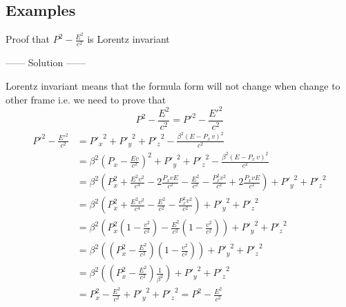 \subsection{Examples}
\begin{example}
Proof that $P^2 - \frac{E^2}{c^2}$ is Lorentz invariant
\begin{center}
    ------ \textcolor{Solution}{Solution} ------
\end{center}
Lorentz invariant means that the formula form will not change when change to other frame i.e. we need to prove that 
\[
    P^2 - \frac{E^2}{c^2} = {P'}^2 - \frac{{E'}^2}{c^2}
\]
\begin{align*}
    {P'}^2 - \frac{{E'}^2}{c^2} &={P'_x}^2 + {P'_y}^2 + {P'_z}^2 - \frac{\beta^2{\left(E - P_x\, v\right)}^2}{c^2}\\
                                &=\beta^2{\left(P_x - \frac{Ev}{c^2}\right)}^2 + {P'_y}^2 + {P'_z}^2 - \frac{\beta^2{\left(E - P_x\, v\right)}^2}{c^2}\\
                                &=\beta^2\left(P_x^2 + \frac{E^2v^2}{c^4} - 2\frac{P_x v E }{c^2} - \frac{E^2}{c^2} - \frac{P_x^2 v^2}{c^2} + 2\frac{P_x v E}{c^2}\right) + {P'_y}^2 + {P'_z}^2\\
                                &=\beta^2\left(P_x^2 + \frac{E^2v^2}{c^4} - \frac{E^2}{c^2} - \frac{P_x^2 v^2}{c^2}\right) + {P'_y}^2 + {P'_z}^2\\
                                &=\beta^2\left(P_x^2\left(1 - \frac{v^2}{c^2}\right)-\frac{E^2}{c^2}\left(1 - \frac{v^2}{c^2}\right)\right) + {P'_y}^2 + {P'_z}^2\\
                                &=\beta^2\left(\left(P_x^2 - \frac{E^2}{c^2} \right)\left(1 - \frac{v^2}{c^2}\right)\right) + {P'_y}^2 + {P'_z}^2\\
                                &=\beta^2\left(\left(P_x^2 - \frac{E^2}{c^2}\right)\frac{1}{\beta^2}\right) + {P'_y}^2 + {P'_z}^2\\
                                &=P_x^2 - \frac{E^2}{c^2} + {P'_y}^2 + {P'_z}^2 = P^2 - \frac{E^2}{c^2}
\end{align*}
\end{example}
